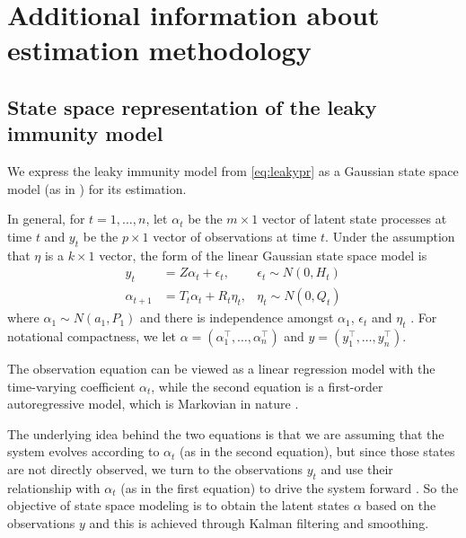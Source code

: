 \documentclass{article}
\begin{document}
\section{Additional information about estimation methodology}

\subsection{State space representation of the leaky immunity model}

We express the leaky immunity model from \autoref{eq:leakypr}
as a Gaussian state space model (as in \citealp{durbin2012time, helske2017kfas})
for its estimation.

In general, for $t = 1, \dots, n$, let $\alpha_t$ be the $m \times 1$ vector of latent
state processes at time $t$ and $y_t$ be the $p \times 1$ vector of observations
at time $t$. Under the assumption that $\eta$ is a $k \times 1$ vector, the
form of the linear Gaussian state space model is 
\begin{align}
y_t &= Z\alpha_t + \epsilon_t, & \epsilon_t \sim N(0, H_t) \label{eq:ss1}\\
\alpha_{t+1} &= T_t\alpha_t + R_t\eta_t, & \eta_t \sim N(0, Q_t) \label{eq:ss2}
\end{align}
where $\alpha_1 \sim N(a_1, P_1)$ and 
there is independence amongst $\alpha_1$, $\epsilon_t$ and $\eta_t$
\citep{helske2017kfas, durbin2012time}. For notational
compactness, we let $\alpha = \left ( \alpha_1^\top, \dots, \alpha_n^\top \right )$
and $y = \left ( y_1^\top, \dots, y_n^\top \right )$.

The observation equation can be viewed as a linear regression model with the
time-varying coefficient $\alpha_t$, while the second equation is a first-order
autoregressive model, which is Markovian in nature \citep{durbin2012time}. 

The underlying idea behind the two equations is that we are assuming that the
system evolves according to $\alpha_t$ (as in the second equation), 
but since those states are
not directly observed, we turn to the observations $y_t$ and use their
relationship with $\alpha_t$ (as in the first equation) to drive the system
forward \citep{durbin2012time}. So the objective of state space modeling is to
obtain the latent states $\alpha$ based on the observations $y$ and this is
achieved through Kalman filtering and smoothing. 
\end{document}
